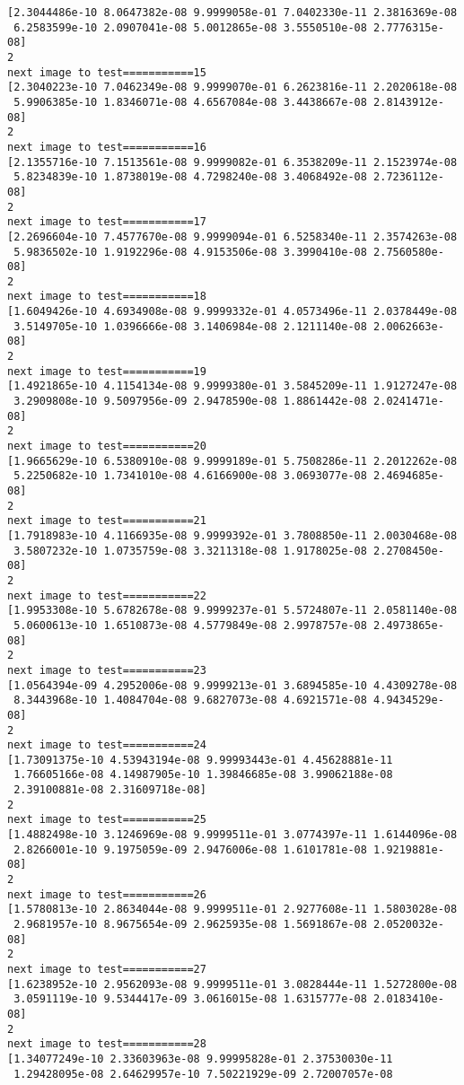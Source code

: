 \documentclass[11pt]{article}
\begin{document}
\begin{Verbatim}[commandchars=\\\{\}]
[2.3044486e-10 8.0647382e-08 9.9999058e-01 7.0402330e-11 2.3816369e-08
 6.2583599e-10 2.0907041e-08 5.0012865e-08 3.5550510e-08 2.7776315e-08]
2
next image to test===========15
[2.3040223e-10 7.0462349e-08 9.9999070e-01 6.2623816e-11 2.2020618e-08
 5.9906385e-10 1.8346071e-08 4.6567084e-08 3.4438667e-08 2.8143912e-08]
2
next image to test===========16
[2.1355716e-10 7.1513561e-08 9.9999082e-01 6.3538209e-11 2.1523974e-08
 5.8234839e-10 1.8738019e-08 4.7298240e-08 3.4068492e-08 2.7236112e-08]
2
next image to test===========17
[2.2696604e-10 7.4577670e-08 9.9999094e-01 6.5258340e-11 2.3574263e-08
 5.9836502e-10 1.9192296e-08 4.9153506e-08 3.3990410e-08 2.7560580e-08]
2
next image to test===========18
[1.6049426e-10 4.6934908e-08 9.9999332e-01 4.0573496e-11 2.0378449e-08
 3.5149705e-10 1.0396666e-08 3.1406984e-08 2.1211140e-08 2.0062663e-08]
2
next image to test===========19
[1.4921865e-10 4.1154134e-08 9.9999380e-01 3.5845209e-11 1.9127247e-08
 3.2909808e-10 9.5097956e-09 2.9478590e-08 1.8861442e-08 2.0241471e-08]
2
next image to test===========20
[1.9665629e-10 6.5380910e-08 9.9999189e-01 5.7508286e-11 2.2012262e-08
 5.2250682e-10 1.7341010e-08 4.6166900e-08 3.0693077e-08 2.4694685e-08]
2
next image to test===========21
[1.7918983e-10 4.1166935e-08 9.9999392e-01 3.7808850e-11 2.0030468e-08
 3.5807232e-10 1.0735759e-08 3.3211318e-08 1.9178025e-08 2.2708450e-08]
2
next image to test===========22
[1.9953308e-10 5.6782678e-08 9.9999237e-01 5.5724807e-11 2.0581140e-08
 5.0600613e-10 1.6510873e-08 4.5779849e-08 2.9978757e-08 2.4973865e-08]
2
next image to test===========23
[1.0564394e-09 4.2952006e-08 9.9999213e-01 3.6894585e-10 4.4309278e-08
 8.3443968e-10 1.4084704e-08 9.6827073e-08 4.6921571e-08 4.9434529e-08]
2
next image to test===========24
[1.73091375e-10 4.53943194e-08 9.99993443e-01 4.45628881e-11
 1.76605166e-08 4.14987905e-10 1.39846685e-08 3.99062188e-08
 2.39100881e-08 2.31609718e-08]
2
next image to test===========25
[1.4882498e-10 3.1246969e-08 9.9999511e-01 3.0774397e-11 1.6144096e-08
 2.8266001e-10 9.1975059e-09 2.9476006e-08 1.6101781e-08 1.9219881e-08]
2
next image to test===========26
[1.5780813e-10 2.8634044e-08 9.9999511e-01 2.9277608e-11 1.5803028e-08
 2.9681957e-10 8.9675654e-09 2.9625935e-08 1.5691867e-08 2.0520032e-08]
2
next image to test===========27
[1.6238952e-10 2.9562093e-08 9.9999511e-01 3.0828444e-11 1.5272800e-08
 3.0591119e-10 9.5344417e-09 3.0616015e-08 1.6315777e-08 2.0183410e-08]
2
next image to test===========28
[1.34077249e-10 2.33603963e-08 9.99995828e-01 2.37530030e-11
 1.29428095e-08 2.64629957e-10 7.50221929e-09 2.72007057e-08

\end{Verbatim}
\end{document}
